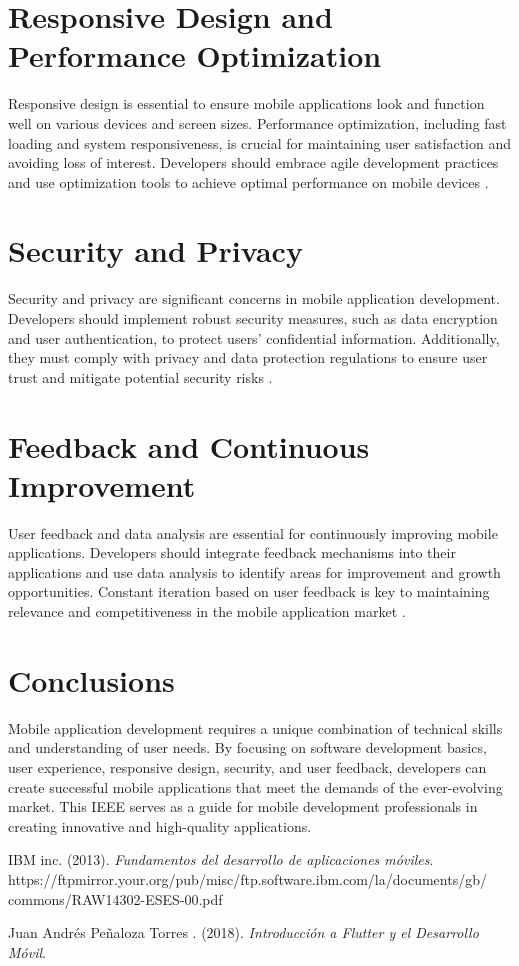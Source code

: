 \documentclass[journal]{IEEEtran}
\begin{document}
\section{Responsive Design and Performance Optimization}
Responsive design is essential to ensure mobile applications look and function well on various devices and screen sizes. Performance optimization, including fast loading and system responsiveness, is crucial for maintaining user satisfaction and avoiding loss of interest. Developers should embrace agile development practices and use optimization tools to achieve optimal performance on mobile devices \cite{design}.

\section{Security and Privacy}
Security and privacy are significant concerns in mobile application development. Developers should implement robust security measures, such as data encryption and user authentication, to protect users' confidential information. Additionally, they must comply with privacy and data protection regulations to ensure user trust and mitigate potential security risks \cite{security}.

\section{Feedback and Continuous Improvement}
User feedback and data analysis are essential for continuously improving mobile applications. Developers should integrate feedback mechanisms into their applications and use data analysis to identify areas for improvement and growth opportunities. Constant iteration based on user feedback is key to maintaining relevance and competitiveness in the mobile application market \cite{feedback}.

\section{Conclusions}
Mobile application development requires a unique combination of technical skills and understanding of user needs. By focusing on software development basics, user experience, responsive design, security, and user feedback, developers can create successful mobile applications that meet the demands of the ever-evolving market. This IEEE serves as a guide for mobile development professionals in creating innovative and high-quality applications.

\begin{thebibliography}{1}
IBM inc. (2013). \textit{Fundamentos del desarrollo
de aplicaciones móviles}. https://ftpmirror.your.org/pub/misc/ftp.software.ibm.com/la/documents/gb/
commons/RAW14302-ESES-00.pdf

Juan Andrés Peñaloza Torres
. (2018). \textit{Introducción a Flutter y el Desarrollo Móvil}.
\end{thebibliography}
\end{document}
